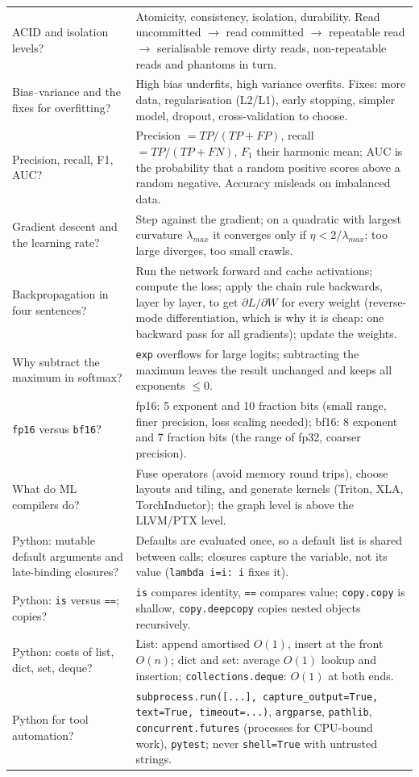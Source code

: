 \documentclass[10pt,a4paper,openany,oneside]{report}
\begin{document}
\begin{center}
\begin{xltabular}{\textwidth}{@{}L{4.6cm}Y@{}}
ACID and isolation levels? & Atomicity, consistency, isolation, durability. Read uncommitted $\to$ read committed $\to$ repeatable read $\to$ serialisable remove dirty reads, non-repeatable reads and phantoms in turn.\\
Bias--variance and the fixes for overfitting? & High bias underfits, high variance overfits. Fixes: more data, regularisation (L2/L1), early stopping, simpler model, dropout, cross-validation to choose.\\
Precision, recall, F1, AUC? & Precision $=TP/(TP+FP)$, recall $=TP/(TP+FN)$, $F_1$ their harmonic mean; AUC is the probability that a random positive scores above a random negative. Accuracy misleads on imbalanced data.\\
Gradient descent and the learning rate? & Step against the gradient; on a quadratic with largest curvature $\lambda_{max}$ it converges only if $\eta<2/\lambda_{max}$; too large diverges, too small crawls.\\
Backpropagation in four sentences? & Run the network forward and cache activations; compute the loss; apply the chain rule backwards, layer by layer, to get $\partial L/\partial W$ for every weight (reverse-mode differentiation, which is why it is cheap: one backward pass for all gradients); update the weights.\\
Why subtract the maximum in softmax? & \texttt{exp} overflows for large logits; subtracting the maximum leaves the result unchanged and keeps all exponents $\le0$.\\
\texttt{fp16} versus \texttt{bf16}? & fp16: 5 exponent and 10 fraction bits (small range, finer precision, loss scaling needed); bf16: 8 exponent and 7 fraction bits (the range of fp32, coarser precision).\\
What do ML compilers do? & Fuse operators (avoid memory round trips), choose layouts and tiling, and generate kernels (Triton, XLA, TorchInductor); the graph level is above the LLVM/PTX level.\\
Python: mutable default arguments and late-binding closures? & Defaults are evaluated once, so a default list is shared between calls; closures capture the variable, not its value (\texttt{lambda i=i: i} fixes it).\\
Python: \texttt{is} versus \texttt{==}; copies? & \texttt{is} compares identity, \texttt{==} compares value; \texttt{copy.copy} is shallow, \texttt{copy.deepcopy} copies nested objects recursively.\\
Python: costs of list, dict, set, deque? & List: append amortised $O(1)$, insert at the front $O(n)$; dict and set: average $O(1)$ lookup and insertion; \texttt{collections.deque}: $O(1)$ at both ends.\\
Python for tool automation? & \texttt{subprocess.run([...], capture\_output=True, text=True, timeout=...)}, \texttt{argparse}, \texttt{pathlib}, \texttt{concurrent.futures} (processes for CPU-bound work), \texttt{pytest}; never \texttt{shell=True} with untrusted strings.\\
\bottomrule
\end{xltabular}
\end{center}
\end{document}
